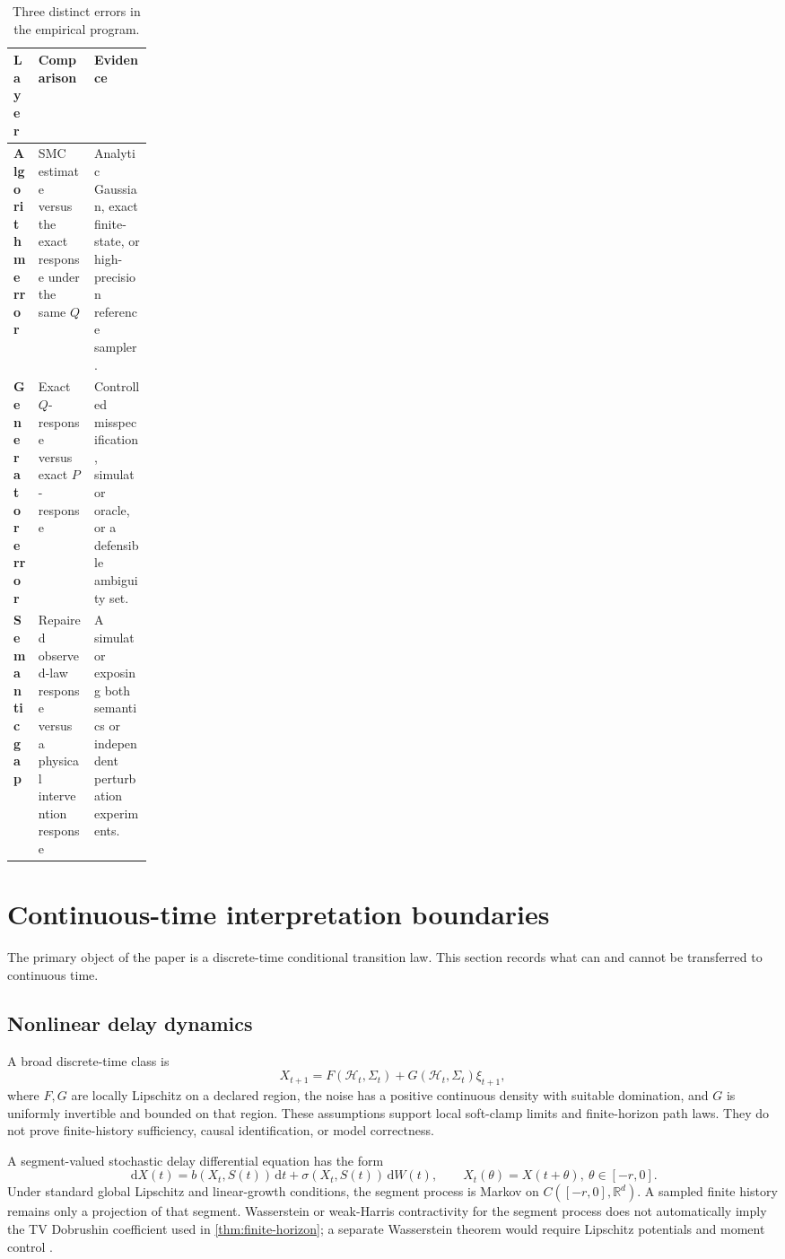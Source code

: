 \documentclass{article}
\newcommand{\R}{\mathbb R}
\newcommand{\Hist}{\mathcal H}
\newcommand{\dd}{\,\mathrm d}
\theoremstyle{remark}
\begin{document}
\begin{table}[h]
\centering
\small
\caption{Three distinct errors in the empirical program.}
\label{tab:error-layers-app}
\begin{tabularx}{\linewidth}{>{\bfseries}p{0.18\linewidth}XX}
\toprule
Layer & Comparison & Evidence \\
\midrule
Algorithm error &
SMC estimate versus the exact response under the same \(Q\) &
Analytic Gaussian, exact finite-state, or high-precision reference sampler.\\
Generator error &
Exact \(Q\)-response versus exact \(P\)-response &
Controlled misspecification, simulator oracle, or a defensible ambiguity set.\\
Semantic gap &
Repaired observed-law response versus a physical intervention response &
A simulator exposing both semantics or independent perturbation experiments.\\
\bottomrule
\end{tabularx}
\end{table}

\section{Continuous-time interpretation boundaries}
\label{app:continuous}

The primary object of the paper is a discrete-time conditional transition law.
This section records what can and cannot be transferred to continuous time.

\subsection{Nonlinear delay dynamics}

A broad discrete-time class is
\begin{equation}
  X_{t+1}
  =
  F(\Hist_t,\Sigma_t)
  +
  G(\Hist_t,\Sigma_t)\xi_{t+1},
  \label{eq:discrete-delay-app}
\end{equation}
where \(F,G\) are locally Lipschitz on a declared region, the noise has a
positive continuous density with suitable domination, and \(G\) is uniformly
invertible and bounded on that region. These assumptions support local
soft-clamp limits and finite-horizon path laws. They do not prove finite-history
sufficiency, causal identification, or model correctness.

A segment-valued stochastic delay differential equation has the form
\begin{equation}
  \dd X(t)
  =
  b(X_t,S(t))\dd t
  +
  \sigma(X_t,S(t))\dd W(t),
  \qquad
  X_t(\theta)=X(t+\theta),\ \theta\in[-r,0].
  \label{eq:sdde-app}
\end{equation}
Under standard global Lipschitz and linear-growth conditions, the segment
process is Markov on \(C([-r,0],\R^d)\). A sampled finite history remains only
a projection of that segment. Wasserstein or weak-Harris contractivity for the
segment process does not automatically imply the TV Dobrushin coefficient used
in \cref{thm:finite-horizon}; a separate Wasserstein theorem would require
Lipschitz potentials and moment control \citep{hairer2011delay}.
\end{document}
